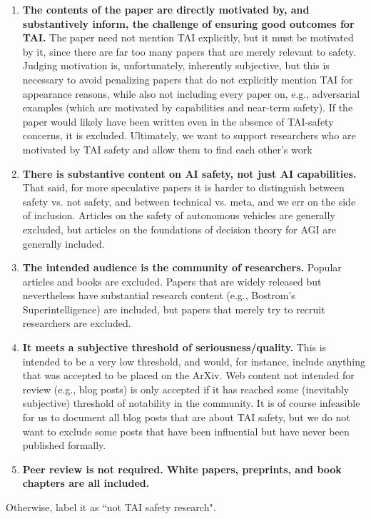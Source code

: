 \documentclass{article}
\begin{document}
\begin{enumerate}
    \item \textbf{The contents of the paper are directly motivated by, and substantively inform, the challenge of ensuring good outcomes for TAI.} The paper need not mention TAI explicitly, but it must be motivated by it, since there are far too many papers that are merely relevant to safety. Judging motivation is, unfortunately, inherently subjective, but this is necessary to avoid penalizing papers that do not explicitly mention TAI for appearance reasons, while also not including every paper on, e.g., adversarial examples (which are motivated by capabilities and near-term safety). If the paper would likely have been written even in the absence of TAI-safety concerns, it is excluded. Ultimately, we want to support researchers who are motivated by TAI safety and allow them to find each other's work
    \item \textbf{There is substantive content on AI safety, not just AI capabilities.} That said, for more speculative papers it is harder to distinguish between safety vs. not safety, and between technical vs. meta, and we err on the side of inclusion. Articles on the safety of autonomous vehicles are generally excluded, but articles on the foundations of decision theory for AGI are generally included.
    \item \textbf{The intended audience is the community of researchers.} Popular articles and books are excluded. Papers that are widely released but nevertheless have substantial research content (e.g., Bostrom's Superintelligence) are included, but papers that merely try to recruit researchers are excluded.
    \item \textbf{It meets a subjective threshold of seriousness/quality.} This is intended to be a very low threshold, and would, for instance, include anything that was accepted to be placed on the ArXiv. Web content not intended for review (e.g., blog posts) is only accepted if it has reached some (inevitably subjective) threshold of notability in the community. It is of course infeasible for us to document all blog posts that are about TAI safety, but we do not want to exclude some posts that have been influential but have never been published formally.
    \item \textbf{Peer review is not required. White papers, preprints, and book chapters are all included.}
\end{enumerate}

Otherwise, label it as ``not TAI safety research". \\
\end{document}
